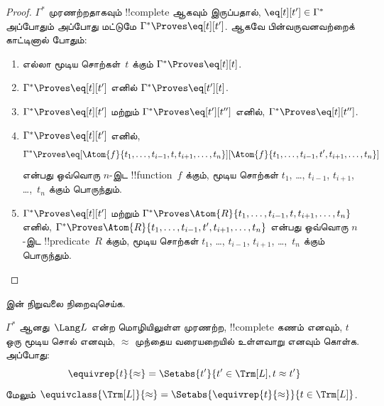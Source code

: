 \documentclass[../../../include/open-logic-section]{subfiles}
\begin{document}
\begin{proof}
$\Gamma^*$ முரணற்றதாகவும் !!{complete} ஆகவும் இருப்பதால், $\eq[t][t'] \in
\Gamma^*$ அப்போதும் அப்போது மட்டுமே $\Gamma^* \Proves \eq[t][t']$. ஆகவே
பின்வருவனவற்றைக் காட்டினால் போதும்:
\begin{enumerate}
\item எல்லா மூடிய சொற்கள்~$t$ க்கும் $\Gamma^* \Proves \eq[t][t]$.
\item $\Gamma^* \Proves \eq[t][t']$ எனில் $\Gamma^* \Proves \eq[t'][t]$.
\item $\Gamma^* \Proves \eq[t][t']$ மற்றும் $\Gamma^* \Proves
  \eq[t'][t'']$ எனில், $\Gamma^* \Proves \eq[t][t'']$.
\item $\Gamma^* \Proves \eq[t][t']$ எனில்,
\[
\Gamma^* \Proves
\eq[\Atom{f}{t_1,\dots,t_{i-1},t,t_{i+1},\dots,t_n}][\Atom{f}{t_1,\dots,t_{i-1},t',t_{i+1},\dots,t_n}]
\]
என்பது ஒவ்வொரு $n$-இட !!{function}~$f$ க்கும், மூடிய சொற்கள் $t_1$, \dots,
$t_{i-1}$, $t_{i+1}$, \dots,~$t_n$ க்கும் பொருந்தும்.
\item $\Gamma^* \Proves \eq[t][t']$ மற்றும்
$\Gamma^* \Proves
\Atom{R}{t_1,\dots,t_{i-1},t,t_{i+1},\dots,t_n}$ எனில்,
$\Gamma^* \Proves \Atom{R}{t_1,\dots,t_{i-1},t',t_{i+1},\dots,t_n}$
என்பது ஒவ்வொரு $n$-இட !!{predicate}~$R$ க்கும், மூடிய சொற்கள் $t_1$, \dots,
$t_{i-1}$, $t_{i+1}$, \dots,~$t_n$ க்கும் பொருந்தும்.
\end{enumerate}
\end{proof}

\begin{prob}
 இன் நிறுவலை நிறைவுசெய்க.
\end{prob}

\begin{defn}
$\Gamma^*$ ஆனது~$\Lang L$ என்ற மொழியிலுள்ள முரணற்ற, !!{complete} கணம்
எனவும், $t$ ஒரு மூடிய சொல் எனவும், $\approx$ முந்தைய வரையறையில்
உள்ளவாறு எனவும் கொள்க. அப்போது:
\[
\equivrep{t}{\approx} = \Setabs{t'}{t'\in \Trm[L], t \approx t'}
\]
மேலும் $\equivclass{\Trm[L]}{\approx} = \Setabs{\equivrep{t}{\approx}}{t \in \Trm[L]}$.
\end{defn}
\end{document}
